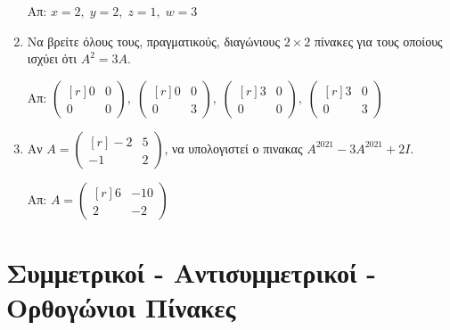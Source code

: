 \begin{enumerate}
  \hfill Απ: $ x=2, \; y=2, \; z=1, \; w=3 $ 

\item Να βρείτε όλους τους, πραγματικούς, διαγώνιους $ 2 \times 2 $ πίνακες για τους 
  οποίους ισχύει ότι $ A^{2}=3A $.

  \hfill Απ: $\scriptstyle{ 
  \begin{pmatrix*}[r]
    0 & 0 \\
    0 &0
  \end{pmatrix*}, \; 
  \begin{pmatrix*}[r]
    0 & 0 \\
    0 & 3
  \end{pmatrix*}, \; 
  \begin{pmatrix*}[r]
    3 & 0 \\
    0 & 0
  \end{pmatrix*}, \; 
  \begin{pmatrix*}[r]
    3 & 0 \\
    0 & 3
\end{pmatrix*}} $
  

\item Αν $ A = 
  \begin{pmatrix*}[r]
    -2 & 5 \\
    -1 & 2
  \end{pmatrix*} $, να υπολογιστεί ο πινακας $ A^{2021} - 3A^{2021} +2I $. 

  \hfill Απ: $ A = 
  \begin{pmatrix*}[r]
    6 & -10 \\
    2 & -2
  \end{pmatrix*} $ 
\end{enumerate}

\section*{Συμμετρικοί - Αντισυμμετρικοί - Ορθογώνιοι Πίνακες}

